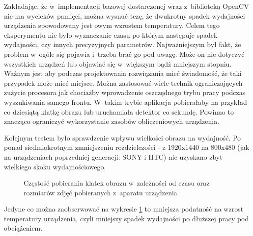 Zakładając, że w~implementacji bazowej dostarczonej wraz z~biblioteką 
OpenCV nie ma wycieków pamięci, można wysnuć tezę, że dwukrotny spadek
wydajności urządzenia spowodowany jest owym wzrostem temperatury.
Celem tego eksperymentu nie było wyznaczanie czasu
po którym następuje spadek wydajności, czy innych precyzyjnych parametrów.
Najważniejszym był fakt, że problem w~ogóle się pojawia i~trzeba brać go pod uwagę.
Może on nie dotyczyć wszystkich urządzeń lub objawiać się w~większym bądź
mniejszym stopniu. Ważnym jest aby podczas projektowania rozwiązania
mieć świadomość, że taki przypadek może mieć miejsce.
 Można zastosować wiele technik ograniczających zużycie 
procesora jak chociażby wprowadzenie oszczędnego trybu pracy podczas
wyszukiwania samego frontu. W~takim trybie aplikacja pobierałaby na przykład
co dziesiątą klatkę obrazu lub uruchamiała detektor
co sekundę. Powinno to znacząco ograniczyć wykorzystanie zasobów
obliczeniowych urządzenia.

Kolejnym testem było sprawdzenie wpływu wielkości obrazu na 
wydajność. Po ponad siedmiokrotnym zmniejszeniu rozdzielczości - z 1920x1440 na 
800x480 (jak na urządzeniach poprzedniej generacji: SONY i HTC) nie uzyskano 
zbyt wielkiego skoku wydajnościowego. 

\begin{figure}[h!]
	\begin{center}
	\end{center}
	\caption{Częstość pobierania klatek obrazu w~zależności od czasu oraz
		rozmiarów zdjęć pobieranych z~aparatu urządzenia}
	\label{chart:time_2_temp_2_fps_with_resolution_change}
\end{figure}

Jedyne co można zaobserwować na wykresie \ref{chart:time_2_temp_2_fps_with_resolution_change} to mniejsza podatność
na wzrost temperatury urządzenia, czyli mniejszy spadek wydajności
po dłuższej pracy pod obciążeniem.

